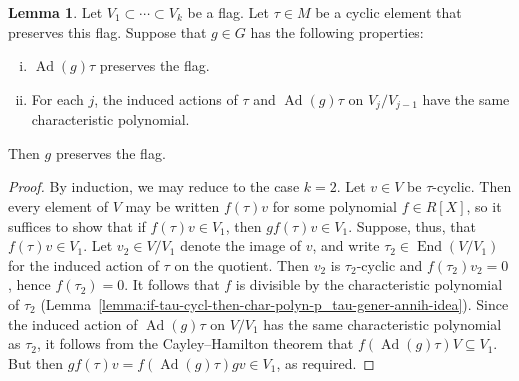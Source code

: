 \documentclass[reqno]{amsart}
\DeclareMathOperator{\Ad}{Ad}
\DeclareMathOperator{\End}{End}
\theoremstyle{plain} \newtheorem{theorem} {Theorem} \newtheorem{conjecture} {Conjecture} \newtheorem{corollary} [theorem] {Corollary} \newtheorem{proposition} [theorem] {Proposition} \newtheorem{fact} [theorem] {Fact}
\theoremstyle{definition} \newtheorem{definition} [theorem] {Definition}
\theoremstyle{itplain} %
\newtheorem{lemma}[theorem]{Lemma}
\begin{document}
\begin{lemma}\label{lemma:let-r-be-ring.-write-v-:=-mathbfvr-m-:=-mathbfmr-e}
  Let $V_1 \subset \dotsb \subset V_k$ be a flag.  Let $\tau \in M$ be a cyclic element that preserves this flag.  Suppose that $g \in G$ has the following properties:
  \begin{enumerate}[(i)]
  \item $\Ad(g) \tau$ preserves the flag.
  \item For each $j$, the induced actions of $\tau$ and $\Ad(g) \tau$ on $V_j / V_{j-1}$ have the same characteristic polynomial.
  \end{enumerate}
  Then $g$ preserves the flag.
\end{lemma}
\begin{proof}
  By induction, we may reduce to the case $k = 2$.  Let $v \in V$ be $\tau$-cyclic.  Then every element of $V$ may be written $f(\tau) v$ for some polynomial $f \in R[X]$, so it suffices to show that if $f(\tau) v \in V_1$, then $g f(\tau) v \in V_1$.  Suppose, thus, that $f(\tau) v \in V_1$.  Let $v_2 \in V/ V_1$ denote the image of $v$, and write $\tau_2 \in \End(V/V_1)$ for the induced action of $\tau$ on the quotient.  Then $v_2$ is $\tau_2$-cyclic and $f(\tau_2) v_2 = 0$, hence $f(\tau_2) = 0$.  It follows that $f$ is divisible by the characteristic polynomial of $\tau_2$ (Lemma~\ref{lemma:if-tau-cycl-then-char-polyn-p_tau-gener-annih-idea}).  Since the induced action of $\Ad(g) \tau$ on $V / V_1$ has the same characteristic polynomial as $\tau_2$, it follows from the Cayley--Hamilton theorem that $f(\Ad(g) \tau) V \subseteq V_1$.  But then $g f(\tau) v = f(\Ad(g) \tau) g v \in V_1$, as required.
\end{proof}
\end{document}
